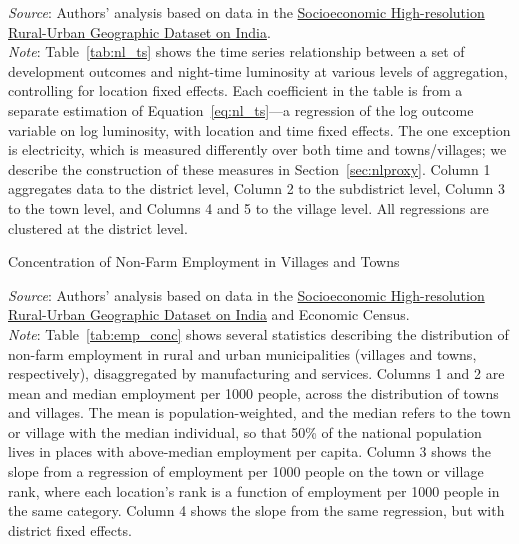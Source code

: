 \documentclass[12pt,letterpaper]{article}
\newcommand{\shrugpath}{.}
\begin{document}
\begin{appendix}
\begin{landscape}
\begin{table}[H]
  \begin{center}
    \footnotesize{}
  \end{center}
  \footnotesize{\textit{Source}: Authors' analysis based on data in the
    \href{http://www.devdatalab.org/shrug}{Socioeconomic
      High-resolution Rural-Urban Geographic Dataset on
      India}. \\ \textit{Note}: Table~\ref{tab:nl_ts} shows the time
    series relationship between a set of development outcomes and
    night-time luminosity at various levels of aggregation,
    controlling for location fixed effects. Each coefficient in the
    table is from a separate estimation of Equation~\ref{eq:nl_ts}---a
    regression of the log outcome variable on log luminosity, with
    location and time fixed effects. The one exception is electricity,
    which is measured differently over both time and towns/villages;
    we describe the construction of these measures in
    Section~\ref{sec:nlproxy}. Column 1 aggregates data to the district
    level, Column 2 to the subdistrict level, Column 3 to the town
    level, and Columns 4 and 5 to the village level. All regressions
    are clustered at the district level.}
  \label{tab:nl_ts}
\end{table}
\end{landscape}

\begin{table}[H]
  \caption{Concentration of Non-Farm Employment in Villages and Towns} 

  \footnotesize{}
  
    \footnotesize{\textit{Source}: Authors' analysis based on data in
      the \href{http://www.devdatalab.org/shrug}{Socioeconomic
        High-resolution Rural-Urban Geographic Dataset on
        India} and Economic Census. \\ \textit{Note}: Table~\ref{tab:emp_conc} shows several
      statistics describing the distribution of non-farm employment in
      rural and urban municipalities (villages and towns,
      respectively), disaggregated by manufacturing and
      services. Columns 1 and 2 are mean and median employment per
      1000 people, across the distribution of towns and villages. The
      mean is population-weighted, and the median refers to the town
      or village with the median individual, so that 50\% of the
      national population lives in places with above-median employment
      per capita. Column 3 shows the slope from a regression of
      employment per 1000 people on the town or village rank, where
      each location's rank is a function of employment per 1000 people
      in the same category. Column 4 shows the slope from the same
      regression, but with district fixed effects.}


\end{table}
\end{appendix}
\end{document}
